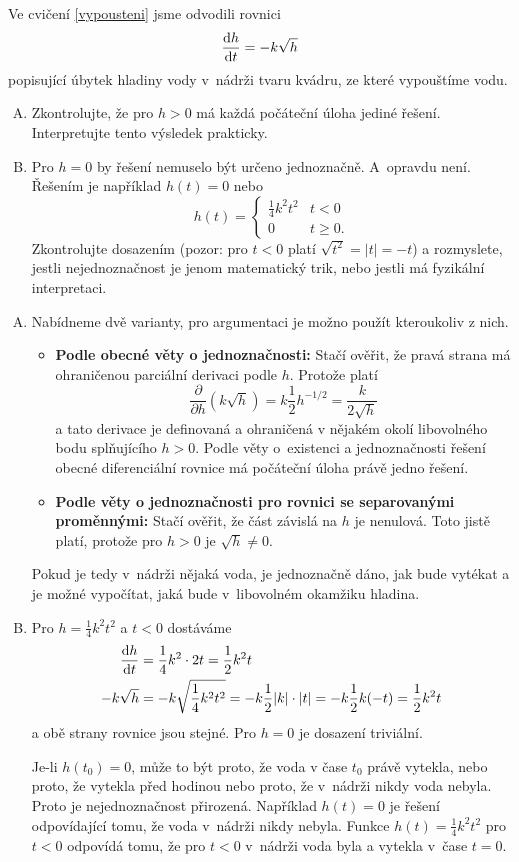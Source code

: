 Ve cvičení \ref{vypousteni}  jsme odvodili rovnici
$$\frac{\mathrm{d}h}{\mathrm{d}t}=-k\sqrt h$$
popisující úbytek hladiny vody v nádrži tvaru kvádru, ze které vypouštíme vodu.
\begin{enumerate}[A)]
\item Zkontrolujte, že pro $h>0$ má každá počáteční úloha jediné řešení. Interpretujte tento výsledek prakticky.
\item Pro $h=0$ by řešení nemuselo být určeno jednoznačně. A opravdu
  není. Řešením je například $h(t)=0$ nebo $$h(t)=
  \begin{cases}
    \frac 14 k^2 t^2 & t<0\\
    0 & t\geq 0.
  \end{cases}
  $$
Zkontrolujte dosazením (pozor: pro $t<0$ platí $\sqrt {t^2}=|t|=-t$) a rozmyslete, jestli nejednoznačnost je jenom matematický trik, nebo jestli má
 fyzikální interpretaci.
\end{enumerate}

\reseni
\begin{enumerate}[A)]
\item Nabídneme dvě  varianty, pro argumentaci je možno použít kteroukoliv z nich. 
  \begin{itemize}
  \item \textbf{Podle obecné věty o jednoznačnosti:} Stačí ověřit, že pravá strana má ohraničenou parciální derivaci podle $h$. Protože platí
    $$\frac{\partial }{\partial h}(k\sqrt h)=k\frac 12
    h^{-1/2}=\frac{k}{2\sqrt h}$$ a tato derivace je definovaná a
    ohraničená v nějakém okolí libovolného bodu splňujícího $h>0$.
    Podle věty o existenci a jednoznačnosti řešení obecné
    diferenciální rovnice má počáteční úloha právě jedno řešení.
  \item \textbf{Podle věty o jednoznačnosti pro rovnici se separovanými proměnnými: } Stačí ověřit,
    že část závislá na $h$ je nenulová. Toto jistě platí, protože pro
    $h>0$ je $\sqrt{h}\neq 0$.
\end{itemize}
Pokud je tedy v nádrži nějaká voda, je jednoznačně dáno,
    jak bude vytékat a je možné vypočítat, jaká bude v libovolném
    okamžiku hladina.
  
\item
  Pro $h=\frac 14 k^2 t^2$ a $t<0$ dostáváme
  \begin{equation*}
    \begin{aligned}
      \frac{\mathrm{d}h}{\mathrm{d}t}&=\frac 14 k^2 \cdot 2t = \frac 12 k^2 t\\
      -k\sqrt h&=-k\sqrt{\frac 14 k^2 t^2} = - k \frac 12 |k| \cdot |t| =
      - k \frac 12 k (-t) = \frac 12 k^2 t
    \end{aligned}
  \end{equation*}
  a obě strany rovnice jsou stejné. Pro $h=0$ je dosazení triviální.
  
  Je-li $h(t_0)=0$, může to být proto, že voda v čase $t_0$ právě vytekla, nebo proto, že vytekla před hodinou nebo proto, že v nádrži nikdy voda nebyla. Proto je nejednoznačnost přirozená. Například $h(t)=0$ je řešení odpovídající tomu, že voda v nádrži nikdy nebyla. Funkce $h(t)=\frac 14 k^2t^2$ pro $t<0$ odpovídá tomu, že pro $t<0$ v nádrži voda byla a vytekla v čase $t=0$.
\end{enumerate}

